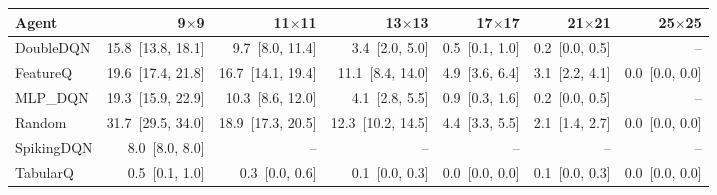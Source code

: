 \begin{tabular}{lrrrrrr}
\toprule
Agent & 9$\times$9 & 11$\times$11 & 13$\times$13 & 17$\times$17 & 21$\times$21 & 25$\times$25 \\
\midrule
DoubleDQN & 15.8~[13.8, 18.1] & 9.7~[8.0, 11.4] & 3.4~[2.0, 5.0] & 0.5~[0.1, 1.0] & 0.2~[0.0, 0.5] & -- \\
FeatureQ & 19.6~[17.4, 21.8] & 16.7~[14.1, 19.4] & 11.1~[8.4, 14.0] & 4.9~[3.6, 6.4] & 3.1~[2.2, 4.1] & 0.0~[0.0, 0.0] \\
MLP_DQN & 19.3~[15.9, 22.9] & 10.3~[8.6, 12.0] & 4.1~[2.8, 5.5] & 0.9~[0.3, 1.6] & 0.2~[0.0, 0.5] & -- \\
Random & 31.7~[29.5, 34.0] & 18.9~[17.3, 20.5] & 12.3~[10.2, 14.5] & 4.4~[3.3, 5.5] & 2.1~[1.4, 2.7] & 0.0~[0.0, 0.0] \\
SpikingDQN & 8.0~[8.0, 8.0] & -- & -- & -- & -- & -- \\
TabularQ & 0.5~[0.1, 1.0] & 0.3~[0.0, 0.6] & 0.1~[0.0, 0.3] & 0.0~[0.0, 0.0] & 0.1~[0.0, 0.3] & 0.0~[0.0, 0.0] \\
\bottomrule
\end{tabular}